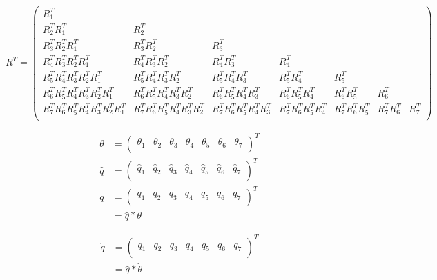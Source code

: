 {\begin{equation*}
    R^T =
    \begin{pmatrix}
        R_1^T &  &  &  &  &  & \\
        R_2^T R_1^T & R_2^T &  &  &  &  & \\
        R_3^T R_2^T R_1^T & R_3^T R_2^T & R_3^T &  &  &  & \\
        R_4^T R_3^T R_2^T R_1^T & R_4^T R_3^T R_2^T & R_4^T R_3^T & R_4^T &  &  & \\
        R_5^T R_4^T R_3^T R_2^T R_1^T & R_5^T R_4^T R_3^T R_2^T & R_5^T R_4^T R_3^T & R_5^T R_4^T & R_5^T &  & \\
        R_6^T R_5^T R_4^T R_3^T R_2^T R_1^T & R_6^T R_5^T R_4^T R_3^T R_2^T & R_6^T R_5^T R_4^T R_3^T & R_6^T R_5^T R_4^T & R_6^T R_5^T & R_6^T & \\
        R_7^T R_6^T R_5^T R_4^T R_3^T R_2^T R_1^T & R_7^T R_6^T R_5^T R_4^T R_3^T R_2^T & R_7^T R_6^T R_5^T R_4^T R_3^T & R_7^T R_6^T R_5^T R_4^T & R_7^T R_6^T R_5^T  & R_7^T R_6^T & R_7^T\\
    \end{pmatrix}
\end{equation*}

\begin{align*}
    \theta &=
        \begin{pmatrix}
            \theta_1 & \theta_2 & \theta_3 & \theta_4 & \theta_5 & \theta_6 & \theta_7 \\
        \end{pmatrix}^T \\
    \hat{q} &=
        \begin{pmatrix}
            \hat{q}_1 & \hat{q}_2 & \hat{q}_3 & \hat{q}_4 & \hat{q}_5 & \hat{q}_6 & \hat{q}_7 \\
        \end{pmatrix}^T \\
    q &=
        \begin{pmatrix}
            q_1 & q_2 & q_3 & q_4 & q_5 & q_6 & q_7 \\
        \end{pmatrix}^T \\
      &= \hat{q} * \theta
\end{align*}

\begin{align*}
    \dot{q} &=
        \begin{pmatrix}
            \dot{q}_1 & \dot{q}_2 & \dot{q}_3 & \dot{q}_4 & \dot{q}_5 & \dot{q}_6 & \dot{q}_7 \\
        \end{pmatrix}^T \\
            &= \hat{q} * \dot{\theta}
\end{align*}

}
